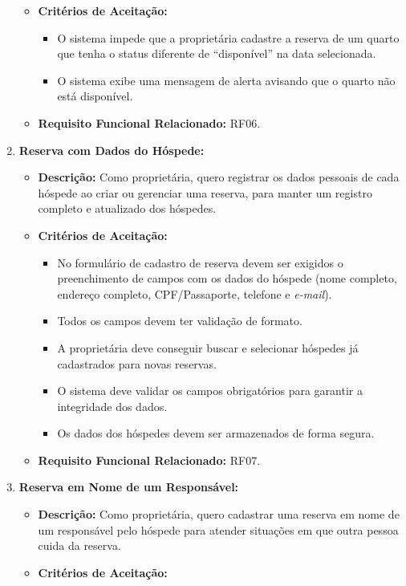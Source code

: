 \documentclass[
	12pt,				%
	openany,			%
	twoside,			%
	a4paper,			%
	english,			%
	french,				%
	spanish,			%
	brazil				%
	]{abntex2}
\begin{document}
\begin{enumerate}[label=\textbf{\arabic*.}]
\begin{itemize}
	 	\item \textbf{Critérios de Aceitação:}
	 	\begin{itemize}
	 		\item O sistema impede que a proprietária cadastre a reserva de um quarto que tenha o status diferente de “disponível” na data selecionada.
	 		\item O sistema exibe uma mensagem de alerta avisando que o quarto não está disponível.
	 	\end{itemize}
	 	\item \textbf{Requisito Funcional Relacionado:} RF06.
	 \end{itemize} 
	  \item \textbf{Reserva com Dados do Hóspede:}
	 \begin{itemize}
	 	\item \textbf{Descrição:} Como proprietária, quero registrar os dados pessoais de cada hóspede ao criar ou gerenciar uma reserva, para manter um registro completo e atualizado dos hóspedes.
	 	\item \textbf{Critérios de Aceitação:}
	 	\begin{itemize}
	 		\item No formulário de cadastro de reserva devem ser exigidos o preenchimento de campos com os dados do hóspede (nome completo, endereço completo, CPF/Passaporte, telefone e \textit{e-mail}).
	 		\item Todos os campos devem ter validação de formato.
	 		\item A proprietária deve conseguir buscar e selecionar hóspedes já cadastrados para novas reservas.
	 		\item O sistema deve validar os campos obrigatórios para garantir a integridade dos dados.
	 		\item Os dados dos hóspedes devem ser armazenados de forma segura.
	 	\end{itemize}
	 	\item \textbf{Requisito Funcional Relacionado:} RF07.
	 \end{itemize} 
	  \item \textbf{Reserva em Nome de um Responsável:}
	 \begin{itemize}
	 	\item \textbf{Descrição:} Como proprietária, quero cadastrar uma reserva em nome de um responsável pelo hóspede para atender situações em que outra pessoa cuida da reserva.
	 	\item \textbf{Critérios de Aceitação:}
	 	\begin{itemize}

\end{itemize}
\end{itemize}
\end{enumerate}
\end{document}
